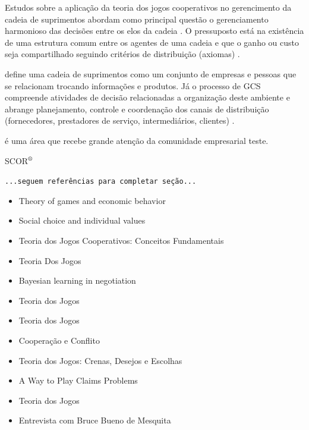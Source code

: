 \documentclass[
	article,			        %
	11pt,				          %
	oneside,			        %
	a4paper,			        %
	english,			        %
	brazil,				        %
	sumario=tradicional
]{abntex2}\usepackage[]{graphicx}\usepackage[]{color}
\begin{document}
Estudos sobre a aplicação da teoria dos jogos cooperativos no gerencimento da cadeia de suprimentos abordam como principal questão o gerenciamento harmonioso das decisões entre os elos da cadeia \cite{Dobos.2010a}. O pressuposto está na existência de uma estrutura comum entre os agentes de uma cadeia e que o ganho ou custo seja compartilhado seguindo critérios de distribuição (axiomas) \cite{Bezerra.2009}.

 define uma cadeia de suprimentos como um conjunto de empresas e pessoas que se relacionam trocando informações e produtos. Já o processo de GCS compreende atividades de decisão relacionadas a organização deste ambiente \cite{Fredendall.2001} e abrange planejamento, controle e coordenação dos canais de distribuição (fornecedores, prestadores de serviço, intermediários, clientes) \cite{Panitz.2007}. 

é uma área que recebe grande atenção da comunidade empresarial  teste.


SCOR$^{\mbox{\scriptsize\textregistered}}$

  \texttt{\color{red}...seguem referências para completar seção...}
  \begin{itemize}
    \item Theory of games and economic behavior \cite{Neumann.1947}
    \item Social choice and individual values \cite{Figueiredo.1994}
    \item Teoria dos Jogos Cooperativos: Conceitos Fundamentais \cite{Moreira.2002}
    \item Teoria Dos Jogos \cite{Fiani.2006}
    \item Bayesian learning in negotiation \cite{Zeng.1998}
    \item Teoria dos Jogos \cite{Tavares.2009}
    \item Teoria dos Jogos \cite{Bierman.2010}
    \item Cooperaç{ã}o e Conflito \cite{Fiani.2011}
    \item Teoria dos Jogos: Crenas, Desejos e Escolhas \cite{Paula.2014}
    \item A Way to Play Claims Problems \cite{Gimenez.2014}
    \item Teoria dos Jogos \cite{Fiani.2015}
    \item Entrevista com Bruce Bueno de Mesquita \cite{Mesquita.2012}
  \end{itemize}

\end{document}
